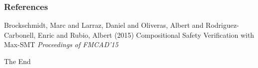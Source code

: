 \documentclass{beamer}
\begin{document}
\begin{frame}
\frametitle{References}
\footnotesize{
\begin{thebibliography}{99} %
 Brockschmidt, Marc and Larraz, Daniel and Oliveras, Albert and Rodriguez-Carbonell, Enric and Rubio, Albert (2015)
\newblock Compositional Safety Verification with Max-SMT
\newblock \emph{Proceedings of FMCAD'15}
\end{thebibliography}
}
\end{frame}


\begin{frame}
\Huge{\centerline{The End}}
\end{frame}

\end{document}
